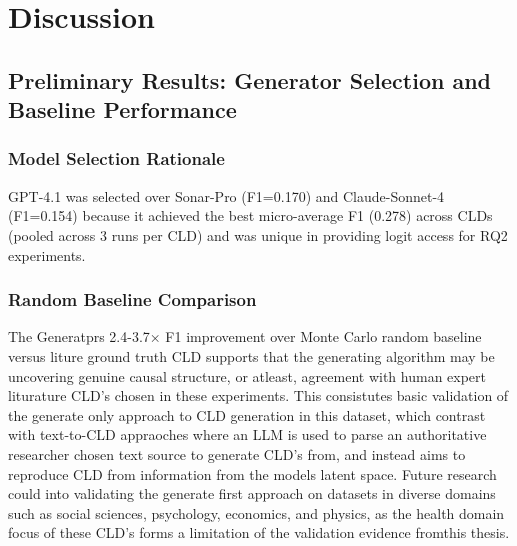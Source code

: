 \section{Discussion}
\label{sec:discussion}

\subsection{Preliminary Results: Generator Selection and Baseline Performance}
\label{sec:discussion_preliminaries}

\subsubsection{Model Selection Rationale}

GPT-4.1 was selected over Sonar-Pro (F1=0.170) and Claude-Sonnet-4 (F1=0.154) because it achieved the best micro-average F1 (0.278) across CLDs (pooled across 3 runs per CLD) and was unique in providing logit access for RQ2 experiments.


\subsubsection{Random Baseline Comparison}

The Generatprs 2.4-3.7× F1 improvement over Monte Carlo random baseline versus liture ground truth CLD supports that the generating algorithm may be uncovering genuine causal structure, or atleast, agreement with human expert liturature CLD's chosen in these experiments.
This consistutes basic validation of the generate only approach to CLD generation in this dataset, which contrast with text-to-CLD appraoches where an LLM is used to parse an authoritative researcher chosen text source to generate CLD's from, and instead aims to reproduce CLD from information from the models latent space. Future research could into validating the generate first approach on datasets in diverse domains such as social sciences, psychology, economics, and physics, as the health domain focus of these CLD's forms a limitation of the validation evidence fromthis thesis.



